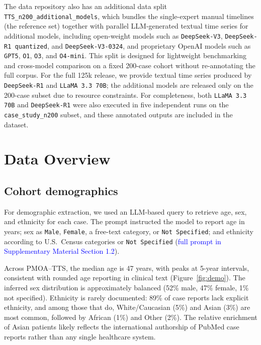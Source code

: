 \documentclass[pdflatex,sn-mathphys-num]{sn-jnl}%
\theoremstyle{thmstyleone}%
\theoremstyle{thmstyletwo}%
\theoremstyle{thmstylethree}%
\begin{document}
The data repository also has an additional data split \texttt{TTS\_n200\_additional\_models}, which bundles the single-expert manual timelines (the reference set) together with parallel LLM-generated textual time series for additional models, including open-weight models such as \texttt{DeepSeek-V3}, \texttt{DeepSeek-R1 quantized}, and \texttt{DeepSeek-V3-0324}, and proprietary OpenAI models such as \texttt{GPT5}, \texttt{O1}, \texttt{O3}, and \texttt{O4-mini}. This split is designed for lightweight benchmarking and cross-model comparison on a fixed 200-case cohort without re-annotating the full corpus. For the full 125k release, we provide textual time series produced by \texttt{DeepSeek-R1} and \texttt{LLaMA 3.3 70B}; the additional models are released only on the 200-case subset due to resource constraints. For completeness, both \texttt{LLaMA 3.3 70B} and \texttt{DeepSeek-R1} were also executed in five independent runs on the \texttt{case\_study\_n200} subset, and these annotated outputs are included in the dataset.



\section{Data Overview}

\subsection{Cohort demographics}

For demographic extraction, we used an LLM-based query to retrieve age, sex, and ethnicity for each case. 
The prompt instructed the model to report age in years; sex as \texttt{Male}, \texttt{Female}, a free-text category, or \texttt{Not Specified}; and ethnicity according to U.S.\ Census categories or \texttt{Not Specified} (\textcolor{blue}{full prompt in Supplementary Material Section 1.2}).

Across PMOA--TTS, the median age is 47 years, with peaks at 5-year intervals, consistent with rounded age reporting in clinical text (Figure~\ref{fig:demo}). 
The inferred sex distribution is approximately balanced (52\% male, 47\% female, 1\% not specified). 
Ethnicity is rarely documented: 89\% of case reports lack explicit ethnicity, and among those that do, White/Caucasian (5\%) and Asian (3\%) are most common, followed by African (1\%) and Other (2\%). 
The relative enrichment of Asian patients likely reflects the international authorship of PubMed case reports rather than any single healthcare system.
\end{document}
